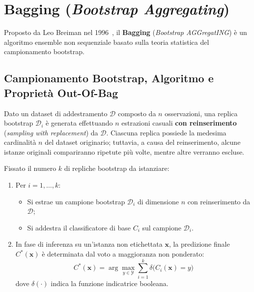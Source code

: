 \FloatBarrier
\section{Bagging (\textit{Bootstrap Aggregating})}
\label{sec:dm-bagging}

Proposto da Leo Breiman nel 1996~\cite{breiman1996bagging}, il \textbf{Bagging} (\textit{Bootstrap AGGregatING}) è un algoritmo ensemble non sequenziale basato sulla teoria statistica del campionamento bootstrap.

\FloatBarrier
\subsection{Campionamento Bootstrap, Algoritmo e Proprietà Out-Of-Bag}
\label{subsec:dm-bootstrap-theory}

Dato un dataset di addestramento $\mathcal{D}$ composto da $n$ osservazioni, una replica bootstrap $\mathcal{D}_i$ è generata effettuando $n$ estrazioni casuali \textbf{con reinserimento} (\textit{sampling with replacement}) da $\mathcal{D}$. Ciascuna replica possiede la medesima cardinalità $n$ del dataset originario; tuttavia, a causa del reinserimento, alcune istanze originali compariranno ripetute più volte, mentre altre verranno escluse.

\begin{definition}
Fissato il numero $k$ di repliche bootstrap da istanziare:
\begin{enumerate}
    \item Per $i = 1, \dots, k$:
    \begin{itemize}
        \item Si estrae un campione bootstrap $\mathcal{D}_i$ di dimensione $n$ con reinserimento da $\mathcal{D}$;
        \item Si addestra il classificatore di base $C_i$ sul campione $\mathcal{D}_i$.
    \end{itemize}
    \item In fase di inferenza su un'istanza non etichettata $\mathbf{x}$, la predizione finale $C^*(\mathbf{x})$ è determinata dal voto a maggioranza non ponderato:
    \begin{equation}
        C^*(\mathbf{x}) = \arg\max_{y \in \mathcal{Y}} \sum_{i=1}^k \delta\big(C_i(\mathbf{x}) = y\big)
    \end{equation}
    dove $\delta(\cdot)$ indica la funzione indicatrice booleana.
\end{enumerate}
\end{definition}

